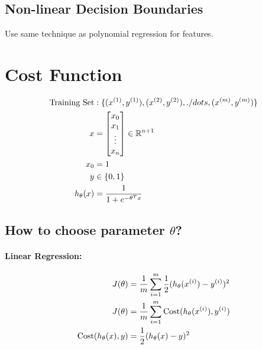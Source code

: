 \subsection*{Non-linear Decision Boundaries}
Use same technique as polynomial regression for features.

\section{Cost Function}
\begin{align*}
    \text{Training Set} & :
    \{(x^{(1)}, y^{(1)}), (x^{(2)}, y^{(2)}), ./dots, (x^{(m)}, y^{(m)})\} \\
    x                   & = \begin{bmatrix}
        x_0    \\
        x_1    \\
        \vdots \\
        x_n    \\
    \end{bmatrix} \in \mathbb{R}^{n+1}         \\
    x_0                 & = 1                                              \\
    y                   & \in \{0, 1\}                                     \\
    h_\theta(x)         & = \frac{1}{1 + e^{-\theta^Tx}}                   \\
\end{align*}

\subsection*{How to choose parameter $\theta$?}

\paragraph{Linear Regression:}
\begin{align*}
    J(\theta)                     & =
    \frac{1}{m}\sum_{i = 1}^m\frac{1}{2}(h_\theta(x^{(i)}) - y^{(i)})^2      \\
    J(\theta)                     & =
    \frac{1}{m}\sum_{i = 1}^m\mathrm{Cost}(h_\theta(x^{(i)}), y^{(i)}) \\
    \mathrm{Cost}(h_\theta(x), y) & = \frac{1}{2}(h_\theta(x) - y)^2         \\
\end{align*}

